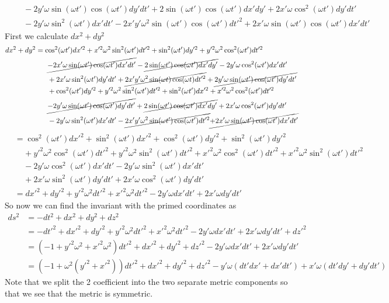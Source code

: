 \documentclass[11pt]{article}
\numberwithin{equation}{section}
\begin{document}
\begin{enumerate}[(a)]
\begin{align*}
&\ \ \ \ \ -2y'\omega\sin(\omega t')\cos(\omega t')dy'dt' + 2\sin(\omega t')\cos(\omega t')dx'dy' + 2x'\omega\cos^2(\omega t')dy'dt'\\
&\ \ \ \ \ -2y'\omega\sin^2(\omega t')dx'dt' -2x'y'\omega^2\sin(\omega t')\cos(\omega t')dt'^2 +2x'\omega\sin(\omega t')\cos(\omega t')dx'dt'
\end{align*}
First we calculate $dx^2+dy^2$
\begin{align*}
dx^2+dy^2  &= \cos^2(\omega t')dx'^2 + x'^2\omega^2\sin^2(\omega t')dt'^2 +\sin^2(\omega t')dy'^2 + y'^2\omega^2\cos^2(\omega t')dt'^2\\
&\ \ \ \ \ \cancel{-2x'\omega\sin(\omega t')\cos(\omega t')dx'dt'} - \cancel{2\sin(\omega t')\cos(\omega t')dx'dy'} - 2y'\omega\cos^2(\omega t')dx'dt'\\
&\ \ \ \ \ +2x'\omega\sin^2(\omega t')dy'dt' + \cancel{2x'y'\omega^2\sin(\omega t)\cos(\omega t)dt'^2} + \cancel{2y'\omega\sin(\omega t')\cos(\omega t')dy'dt'}\\
&\ \ \ \ \ + \cos^2(\omega t')dy'^2 + y'^2\omega^2\sin^2(\omega t')dt'^2 + \sin^2(\omega t')dx'^2 +x'^2\omega^2\cos^2(\omega t')dt'^2\\
&\ \ \ \ \ \cancel{-2y'\omega\sin(\omega t')\cos(\omega t')dy'dt'} + \cancel{2\sin(\omega t')\cos(\omega t')dx'dy'} + 2x'\omega\cos^2(\omega t')dy'dt'\\
&\ \ \ \ \ -2y'\omega\sin^2(\omega t')dx'dt' -\cancel{2x'y'\omega^2\sin(\omega t')\cos(\omega t')dt'^2} \cancel{+2x'\omega\sin(\omega t')\cos(\omega t')dx'dt'}
\end{align*}
\begin{align*}
&= \cos^2(\omega t')dx'^2 + \sin^2(\omega t')dx'^2 + \cos^2(\omega t')dy'^2 + \sin^2(\omega t')dy'^2 \\
&\ \ \ \ \ + y'^2\omega^2\cos^2(\omega t')dt'^2 + y'^2\omega^2\sin^2(\omega t')dt'^2  + x'^2\omega^2\cos^2(\omega t')dt'^2 + x'^2\omega^2\sin^2(\omega t')dt'^2\\
&\ \ \ \ \  -2y'\omega\cos^2(\omega t')dx'dt' - 2y'\omega\sin^2(\omega t')dx'dt'\\
&\ \ \ \ \ +2x'\omega\sin^2(\omega t')dy'dt' +  2x'\omega\cos^2(\omega t')dy'dt'\\
&= dx'^2 + dy'^2  + y'^2\omega^2dt'^2  + x'^2\omega^2dt'^2 -2y'\omega dx'dt' + 2x'\omega dy'dt' 
\end{align*}
So now we can find the invariant with the primed coordinates as
\begin{align*}
ds^2 &= -dt^2 + dx^2 + dy^2 + dz^2 \\
&= -dt'^2 + dx'^2 + dy'^2  + y'^2\omega^2dt'^2  + x'^2\omega^2dt'^2 -2y'\omega dx'dt' + 2x'\omega dy'dt' + dz'^2 \\
&= (-1 + y'^2\omega^2  + x'^2\omega^2)dt'^2 + dx'^2 + dy'^2  + dz'^2 - 2y'\omega dx'dt' + 2x'\omega dy'dt' \\
&= \left(-1 + \omega^2(y'^2 + x'^2)\right)dt'^2 + dx'^2 + dy'^2  + dz'^2 - y'\omega(dt'dx' + dx'dt') + x'\omega (dt'dy' + dy'dt')
\end{align*}
Note that we split the 2 coefficient into the two separate metric components so that we see that the metric is symmetric.


\end{enumerate}
\end{document}
